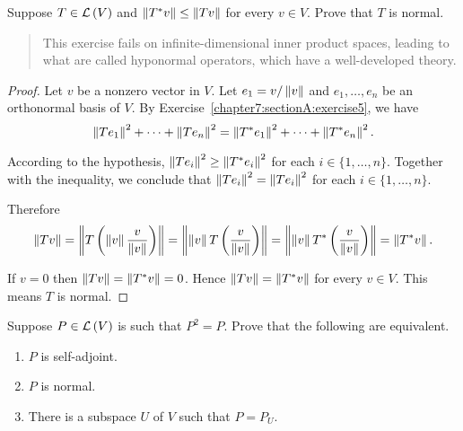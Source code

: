 \begin{exercise}
    Suppose $T\in\mathcal{L}\left({V}\right)$ and $\left\Vert{T^{*}v}\right\Vert \leq \left\Vert{Tv}\right\Vert$ for every $v\in V$. Prove that $T$ is normal.
\end{exercise}

\begin{quote}
    This exercise fails on infinite-dimensional inner product spaces, leading to what are called hyponormal operators, which have a well-developed theory.
\end{quote}

\begin{proof}
    Let $v$ be a nonzero vector in $V$. Let $e_{1} = v/\left\Vert{v}\right\Vert$ and $e_{1}, \ldots, e_{n}$ be an orthonormal basis of $V$. By Exercise~\ref{chapter7:sectionA:exercise5}, we have
    \[
        \left\Vert{Te_{1}}\right\Vert^{2} + \cdots + \left\Vert{Te_{n}}\right\Vert^{2} = \left\Vert{T^{*}e_{1}}\right\Vert^{2} + \cdots + \left\Vert{T^{*}e_{n}}\right\Vert^{2}.
    \]

    According to the hypothesis, $\left\Vert{Te_{i}}\right\Vert^{2}\geq \left\Vert{T^{*}e_{i}}\right\Vert^{2}$ for each $i\in\{1,\ldots, n\}$. Together with the inequality, we conclude that $\left\Vert{Te_{i}}\right\Vert^{2} = \left\Vert{Te_{i}}\right\Vert^{2}$ for each $i\in\{1,\ldots, n\}$.

    Therefore
    \[
        \left\Vert{Tv}\right\Vert = \left\Vert{T\left(\left\Vert{v}\right\Vert\frac{v}{\left\Vert{v}\right\Vert}\right)}\right\Vert = \left\Vert{\left\Vert{v}\right\Vert T\left(\frac{v}{\left\Vert{v}\right\Vert}\right)}\right\Vert = \left\Vert{\left\Vert{v}\right\Vert T^{*}\left(\frac{v}{\left\Vert{v}\right\Vert}\right)}\right\Vert = \left\Vert{T^{*}v}\right\Vert.
    \]

    If $v = 0$ then $\left\Vert{Tv}\right\Vert = \left\Vert{T^{*}v}\right\Vert = 0$. Hence $\left\Vert{Tv}\right\Vert = \left\Vert{T^{*}v}\right\Vert$ for every $v\in V$. This means $T$ is normal.
\end{proof}
\newpage

\begin{exercise}\label{chapter7:sectionA:execise20}
    Suppose $P\in\mathcal{L}\left({V}\right)$ is such that $P^{2} = P$. Prove that the following are equivalent.
    \begin{enumerate}[label={(\alph*)}]
        \item $P$ is self-adjoint.
        \item $P$ is normal.
        \item There is a subspace $U$ of $V$ such that $P = P_{U}$.
    \end{enumerate}
\end{exercise}

